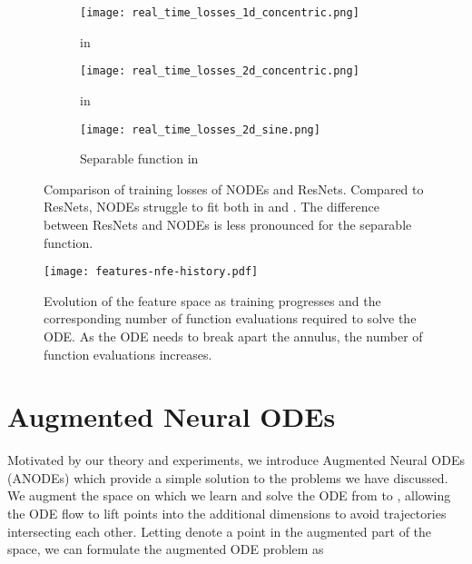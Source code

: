 \documentclass{article}
\begin{document}
\begin{figure}[t]
\centering
\begin{subfigure}[t]{0.30\linewidth}
\centering
\texttt{[image: real\_time\_losses\_1d\_concentric.png]}
\setlength{\abovecaptionskip}{-5pt}
\caption{ in }
\end{subfigure}\hspace{0.01\linewidth}
\begin{subfigure}[t]{0.31\linewidth}
\centering
\texttt{[image: real\_time\_losses\_2d\_concentric.png]}
\setlength{\abovecaptionskip}{-5pt}
\caption{ in }
\end{subfigure}\hspace{0.01\linewidth}
\begin{subfigure}[t]{0.31\linewidth}
\centering
\texttt{[image: real\_time\_losses\_2d\_sine.png]}
\setlength{\abovecaptionskip}{-5pt}
\caption{Separable function in }
\end{subfigure}
\setlength{\belowcaptionskip}{-10pt}
\caption{Comparison of training losses of NODEs and ResNets. Compared to ResNets, NODEs struggle to fit  both in  and . The difference between ResNets and NODEs is less pronounced for the separable function.}
\label{losses-experiments}
\end{figure}

\begin{figure}[h]
\vspace{-5pt}
\begin{center}
\texttt{[image: features-nfe-history.pdf]}
\end{center}
\setlength{\abovecaptionskip}{-5pt}
\setlength{\belowcaptionskip}{-10pt}
\caption{Evolution of the feature space as training progresses and the corresponding number of function evaluations required to solve the ODE. As the ODE needs to break apart the annulus, the number of function evaluations increases.}
\label{feature-space-evolution-nfe}
\end{figure}

\section{Augmented Neural ODEs}
Motivated by our theory and experiments, we introduce Augmented Neural ODEs (ANODEs) which provide a simple solution to the problems we have discussed. We augment the space on which we learn and solve the ODE from  to , allowing the ODE flow to lift points into the additional dimensions to avoid trajectories intersecting each other. Letting  denote a point in the augmented part of the space, we can formulate the augmented ODE problem as
\end{document}
